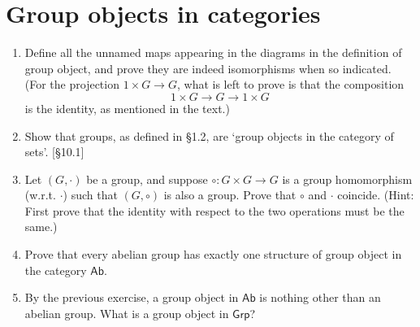 \section{Group objects in categories}
\begin{enumerate}
    \item Define all the unnamed maps appearing in the diagrams in the definition of group object, and prove they are indeed isomorphisms when so indicated. (For the projection $1 \times G \to G$, what is left to prove is that the composition
          \[ 1 \times G \to G \to 1 \times G \]
          is the identity, as mentioned in the text.)

    \item Show that groups, as defined in \S1.2, are `group objects in the category of sets'. [\S10.1]

    \item Let $(G, \cdot)$ be a group, and suppose $\circ: G \times G \to G$ is a group homomorphism (w.r.t. $\cdot$) such that $(G, \circ)$ is also a group. Prove that $\circ$ and $\cdot$ coincide. (Hint: First prove that the identity with respect to the two operations must be the same.)

    \item Prove that every abelian group has exactly one structure of group object in the category $\mathsf{Ab}$.

    \item By the previous exercise, a group object in $\mathsf{Ab}$ is nothing other than an abelian group. What is a group object in $\mathsf{Grp}$?
\end{enumerate}